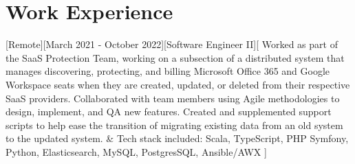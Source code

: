 \documentclass[showluaboxes=false]{resume}
\begin{document}
		\section{Work Experience} %
		[Remote][March 2021 - October 2022][Software Engineer II][%
		Worked as part of the SaaS Protection Team, working on a subsection of a distributed system that manages discovering, protecting, and billing Microsoft Office 365 and Google Workspace seats when they are created, updated, or deleted from their respective SaaS providers. %
		Collaborated with team members using Agile methodologies to design, implement, and QA new features. %
		Created and supplemented support scripts to help ease the transition of migrating existing data from an old system to the updated system. %
		&%
		Tech stack included: Scala, TypeScript, PHP Symfony, Python, Elasticsearch, MySQL, PostgresSQL, Ansible/AWX		
% 
		]%
\end{document}

